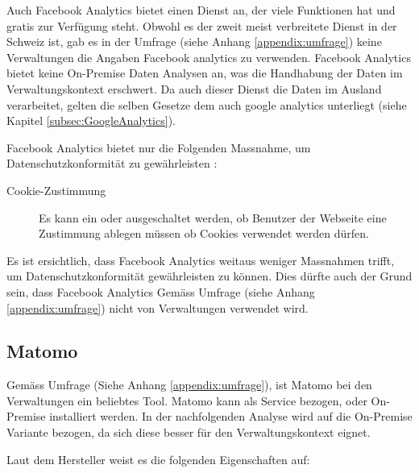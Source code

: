 Auch Facebook Analytics bietet einen Dienst an, der viele Funktionen hat und gratis zur Verfügung steht. Obwohl es der zweit meist verbreitete Dienst in der Schweiz ist, gab es in der Umfrage (siehe Anhang \ref{appendix:umfrage}) keine Verwaltungen die Angaben Facebook analytics zu verwenden. Facebook Analytics bietet keine On-Premise Daten Analysen an, was die Handhabung der Daten im Verwaltungskontext erschwert. Da auch dieser Dienst die Daten im Ausland verarbeitet, gelten die selben Gesetze dem auch google analytics unterliegt (siehe Kapitel \ref{subsec:GoogleAnalytics}). 

Facebook Analytics bietet nur die Folgenden Massnahme, um Datenschutzkonformität zu gewährleisten \parencite{facebookAnalyticsGDPR}: 

\begin{description}
  \item[Cookie-Zustimmung] Es kann ein oder ausgeschaltet werden, ob Benutzer der Webseite eine Zustimmung ablegen müssen ob Cookies verwendet werden dürfen.
\end{description}

Es ist ersichtlich, dass Facebook Analytics weitaus weniger Massnahmen trifft, um Datenschutzkonformität gewährleisten zu können. Dies dürfte auch der Grund sein, dass Facebook Analytics Gemäss Umfrage (siehe Anhang \ref{appendix:umfrage}) nicht von Verwaltungen verwendet wird.

\subsection{Matomo}

Gemäss Umfrage (Siehe Anhang \ref{appendix:umfrage}), ist Matomo bei den Verwaltungen ein beliebtes Tool. Matomo kann als Service bezogen, oder On-Premise installiert werden. In der nachfolgenden Analyse wird auf die On-Premise Variante bezogen, da sich diese besser für den Verwaltungskontext eignet.  

Laut dem Hersteller weist es die folgenden Eigenschaften auf:

